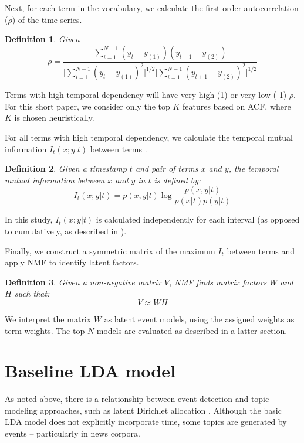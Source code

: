 \documentclass{sig-alternate}
\newtheorem{definition}{Definition}
\begin{document}
Next, for each term in the vocabulary, we calculate the first-order autocorrelation ($\rho$) of the time series. 
\begin{definition}
 Given 
\[
\rho = \dfrac{\sum_{i=1}^{N-1} (y_t - \bar{y}_{(1)})(y_{t+1} - \bar{y}_{(2)})}{ \big [ \sum_{i=1}^{N-1}  (y_t - \bar{y}_{(1)})^2 \big ] ^{1/2} \big [\sum_{i=1}^{N-1} (y_{t+1} - \bar{y}_{(2)})^2 \big ]^{1/2}}
\]
\end{definition}

Terms with high temporal dependency will have very high (1) or very low (-1) $\rho$.  For this short paper, we consider only the top $K$ features based on ACF, where $K$ is chosen heuristically.

For all terms with high temporal dependency, we calculate the temporal mutual information $I_t(x;y \vert t)$ between terms \cite{Teng2008}. 

\begin{definition}
Given a timestamp $t$ and pair of terms $x$ and $y$, the temporal mutual information between $x$ and $y$ in $t$ is defined by:
\[
I_t(x;y \vert t) = p(x,y \vert t) \log \dfrac{p(x,y \vert t)}{p(x \vert t) p(y \vert t)}
\]
\end{definition}

In this study, $I_t(x;y \vert t)$ is calculated independently for each interval (as opposed to cumulatively, as described in \cite{Teng2008}).

Finally, we construct a symmetric matrix of the maximum $I_t$ between terms and apply NMF \cite{Lee2001} to identify latent factors. 
\begin{definition}
 Given a non-negative matrix $V$, NMF finds matrix factors $W$ and $H$ such that:
\[
V \approx WH
\]
\end{definition}

We interpret the matrix $W$ as latent event models, using the assigned weights as term weights. The top $N$ models are evaluated as described in a latter section. 

\section{Baseline LDA model}

As noted above, there is a relationship between event detection and topic modeling approaches, such as latent Dirichlet allocation \cite{Blei2003}. Although the basic LDA model does not explicitly incorporate time, some topics are generated by events -- particularly in news corpora.
\end{document}
